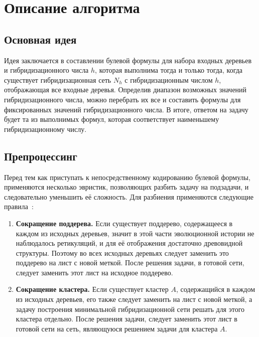 \FloatBarrier
\chapter{Описание алгоритма}

\FloatBarrier
\section{Основная идея}

Идея заключается в составлении булевой формулы для набора входных деревьев и гибридизационного числа $h$, которая выполнима тогда и только тогда, когда существует гибридизационная сеть $N_h$ с гибридизационным числом $h$, отображающая все входные деревья.
Определив диапазон возможных значений гибридизационного числа, можно перебрать их все и составить формулы для фиксированных значений гибридизационного числа.
В итоге, ответом на задачу будет та из выполнимых формул, которая соответствует наименьшему гибридизационному числу.

\FloatBarrier
\section{Препроцессинг}

Перед тем как приступать к непосредственному кодированию булевой формулы, применяются несколько эвристик, позволяющих разбить задачу на подзадачи, и следовательно уменьшить её сложность.
Для разбиения применяются следующие правила~\cite{bonet2009efficiently}:

\begin{enumerate}
	\item \textbf{Сокращение поддерева.} Если существует поддерево, содержащееся в каждом из исходных деревьев, значит в этой части эволюционной истории не наблюдалось ретикуляций, и для её отображения достаточно древовидной структуры.
	Поэтому во всех исходных деревьях следует заменить это поддерево на лист с новой меткой.
	После решения задачи, в готовой сети, следует заменить этот лист на исходное поддерево.
	\item \textbf{Сокращение кластера.} Если существует кластер $A$, содержащийся в каждом из исходных деревьев, его также следует заменить на лист с новой меткой, а задачу построения минимальной гибридизационной сети решать для этого кластера отдельно.
	После решения задачи, следует заменить этот лист в готовой сети на сеть, являющуюся решением задачи для кластера $A$.
\end{enumerate}

